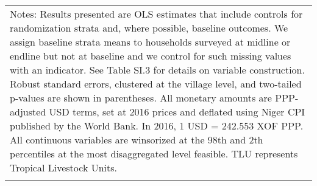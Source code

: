 \begin{longtable}{llcccccccccc}
\hline \hline                                                                                                                                                                                                                                                                                                                                                                                                                                                                                                                                                                                                                                                                                                                                                                                                                                                                             
\multicolumn{12}{p{\textwidth}}{{Notes: Results presented are OLS estimates that include controls for randomization strata and, where possible, baseline outcomes. We assign baseline strata means to households surveyed at midline or endline but not at baseline and we control for such missing values with an indicator. See Table SI.3 for details on variable construction. Robust standard errors, clustered at the village level, and two-tailed p-values are shown in parentheses. All monetary amounts are PPP-adjusted USD terms, set at 2016 prices and deflated using Niger CPI published by the World Bank. In 2016, 1 USD = 242.553 XOF PPP. All continuous variables are winsorized at the 98th and 2th percentiles at the most disaggregated level feasible. TLU represents Tropical Livestock Units. }} \\                                                             
\multicolumn{12}{p{\textwidth}}{{}} \\                                                                                                                                                                                                                                                                                                                                                                                                                                                                                                                                                                                                                                                                                                                                                                                                                                                    

\end{longtable}
